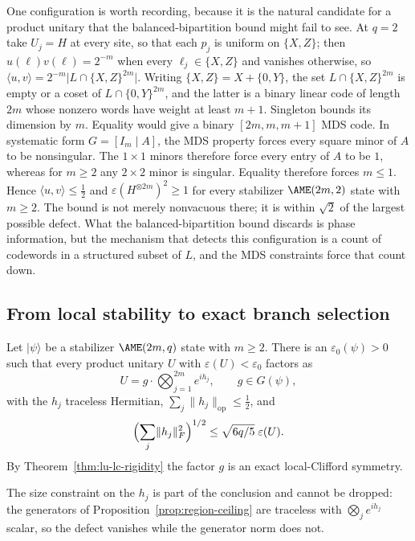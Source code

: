 One configuration is worth recording, because it is the natural candidate
for a product unitary that the balanced-bipartition bound might fail
to see.  At \(q=2\) take \(U_j=H\) at every site, so that each \(p_j\) is
uniform on \(\{X,Z\}\); then \(u(\ell)v(\ell)=2^{-m}\) when every
\(\ell_j\in\{X,Z\}\) and vanishes otherwise, so
\(\langle u,v\rangle=2^{-m}\lvert L\cap\{X,Z\}^{2m}\rvert\).  Writing
\(\{X,Z\}=X+\{0,Y\}\), the set \(L\cap\{X,Z\}^{2m}\) is empty or a coset of
\(L\cap\{0,Y\}^{2m}\), and the latter is a binary linear code of length
\(2m\) whose nonzero words have weight at least \(m+1\).  Singleton bounds
its dimension by \(m\).  Equality would give a binary
\([2m,m,m+1]\) MDS code.  In systematic form \(G=[I_m\mid A]\), the MDS
property forces every square minor of \(A\) to be nonsingular.  The
\(1\times1\) minors therefore force every entry of \(A\) to be \(1\),
whereas for \(m\geq2\) any \(2\times2\) minor is singular.  Equality
therefore forces \(m\leq1\).  Hence \(\langle u,v\rangle\leq\frac12\) and
\(\varepsilon(H^{\otimes2m})^2\geq1\) for every stabilizer
\(\AME(2m,2)\) state with \(m\geq2\).  The bound is not merely nonvacuous
there; it is within \(\sqrt2\) of the largest possible defect.  What the
balanced-bipartition bound discards is phase information, but the mechanism that
detects this configuration is a count of codewords in a structured subset
of \(L\), and the MDS constraints force that count down.

\subsection{From local stability to exact branch selection}

\begin{corollary}
\label{cor:approximate-decomposition}
Let \(\lvert\psi\rangle\) be a stabilizer \(\AME(2m,q)\) state with
\(m\geq2\).  There is an \(\varepsilon_0(\psi)>0\) such that every product
unitary \(U\) with \(\varepsilon(U)<\varepsilon_0\) factors as
\[
 U=g\cdot\bigotimes_{j=1}^{2m}e^{ih_j},\qquad g\in G(\psi),
\]
with the \(h_j\) traceless Hermitian,
\(\sum_j\lVert h_j\rVert_{\mathrm{op}}\leq\frac12\), and
\[
 \Bigl(\sum_j\lVert h_j\rVert_F^2\Bigr)^{1/2}
   \leq\sqrt{6q/5}\;\varepsilon(U).
\]
By Theorem~\ref{thm:lu-lc-rigidity} the factor \(g\) is an exact
local-Clifford symmetry.
\end{corollary}

The size constraint on the \(h_j\) is part of the conclusion and cannot be
dropped: the generators of Proposition~\ref{prop:region-ceiling} are
traceless with \(\bigotimes_je^{ih_j}\) scalar, so the defect vanishes
while the generator norm does not.

